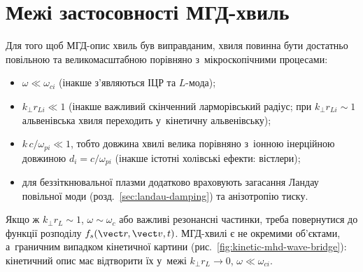 \section{Межі застосовності МГД-хвиль}\label{sec:mhd-limits}



Для того щоб МГД-опис хвиль був виправданим, хвиля повинна бути достатньо повільною та
великомасштабною порівняно з~мікроскопічними процесами:
\begin{itemize}
	\item $\omega\ll\omega_{ci}$ (інакше з'являються ІЦР та $L$-мода);
	\item $k_\perp r_{Li}\ll1$ (інакше важливий скінченний ларморівський радіус; при
	  $k_\perp r_{Li}\sim1$ альвенівська хвиля переходить у~кінетичну альвенівську);
	\item $k\,c/\omega_{pi}\ll1$, тобто довжина хвилі велика порівняно з~іонною інерційною
	  довжиною $d_i=c/\omega_{pi}$ (інакше істотні холівські ефекти: вістлери);
	\item для беззіткнювальної плазми додатково враховують загасання Ландау повільної моди
	  (розд.~\ref{sec:landau-damping}) та анізотропію тиску.
\end{itemize}
Якщо ж $k_\perp r_L\sim1$, $\omega\sim\omega_c$ або важливі резонансні частинки, треба
повернутися до функції розподілу $f_s(\vect r,\vect v,t)$. МГД-хвилі є не окремими
об'єктами, а~граничним випадком кінетичної картини
(рис.~\ref{fig:kinetic-mhd-wave-bridge}): кінетичний опис має відтворити їх у~межі
$k_\perp r_L\to0$, $\omega\ll\omega_{ci}$.


